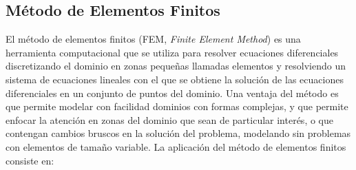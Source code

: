 \subsection*{Método de Elementos Finitos}

El método de elementos finitos (FEM, \textit{Finite Element Method}) es una herramienta computacional que se utiliza para resolver ecuaciones diferenciales discretizando el dominio en zonas pequeñas llamadas elementos y resolviendo un sistema de ecuaciones lineales con el que se obtiene la solución de las ecuaciones diferenciales en un conjunto de puntos del dominio. Una ventaja del método es que permite modelar con facilidad dominios con formas complejas, y que permite enfocar la atención en zonas del dominio que sean de particular interés, o que contengan cambios bruscos en la solución del problema, modelando sin problemas con elementos de tamaño variable. La aplicación del método de elementos finitos consiste en:

